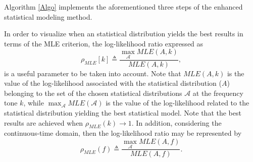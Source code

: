 Algorithm \ref{Algo} implements the aforementioned three steps of the enhanced statistical modeling method. 

In order to visualize when an statistical distribution yields the best results in terms of the \ac{MLE} criterion, the log-likelihood ratio expressed as
\begin{equation}
\rho_{MLE} [k] \triangleq \dfrac{\max_{\mathcal{A}} MLE(A,k)}{MLE(A,k )},
\label{eq:log-lik0}
\end{equation}
is a useful parameter to be taken into account. Note that $ MLE(A,k)$ is the value of the log-likelihood associated with the statistical distribution ($A$) belonging to the set of the chosen statistical distributions $\mathcal{A}$ at the frequency tone $k$, while $\max_{\mathcal{A}} MLE(\mathcal{A})$ is the value of the log-likelihood related to the statistical distribution yielding the best statistical model. Note that the best results are achieved when $\rho_{MLE} (k) \rightarrow 1$. In addition, considering the continuous-time domain, then the log-likelihood ratio may be represented by 
\begin{equation}
\rho_{MLE} (f) \triangleq \dfrac{\max_{\mathcal{A}} MLE(A,f)}{MLE(A,f)}.
\label{eq:log-lik}
\end{equation}


